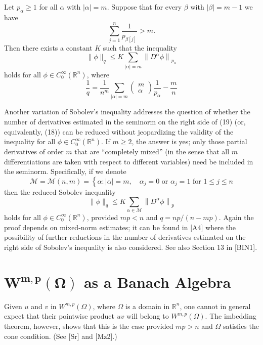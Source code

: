 \begin{theorem}
  Let $p_\alpha \geq 1$ for all $\alpha$ with $|\alpha|=m$. Suppose that for every $\beta$ with $|\beta|=m-1$ we have
  \[
  \sum_{j=1}^n \frac{1}{p_{\beta[j]}}>m .
  \]
  Then there exists a constant $K$ such that the inequality
  \[
  \|\phi\|_q \leq K \sum_{|\alpha|=m}\left\|D^\alpha \phi\right\|_{p_\alpha}
  \]
  holds for all $\phi \in C_0^{\infty}\left(\mathbb{R}^n\right)$, where
  \[
  \frac{1}{q}=\frac{1}{n^m} \sum_{|\alpha|=m}\left(\begin{array}{c}
  m \\
  \alpha
  \end{array}\right) \frac{1}{p_\alpha}-\frac{m}{n}
  \]
\end{theorem}


\begin{para}
  Another variation of Sobolev's inequality addresses the question of whether the number of derivatives estimated in the seminorm on the right side of (19) (or, equivalently, (18)) can be reduced without jeopardizing the validity of the inequality for all $\phi \in C_0^{\infty}\left(\mathbb{R}^n\right)$. If $m \geq 2$, the answer is yes; only those partial derivatives of order $m$ that are ``completely mixed'' (in the sense that all $m$ differentiations are taken with respect to different variables) need be included in the seminorm. Specifically, if we denote
  \[
  \mathcal{M}=\mathcal{M}(n, m)=\left\{\alpha:|\alpha|=m, \quad \alpha_j=0 \text { or } \alpha_j=1 \text { for } 1 \leq j \leq n\right.
  \]
  then the reduced Sobolev inequality
  \[
  \|\phi\|_q \leq K \sum_{\alpha \in \mathcal{M}}\left\|D^\alpha \phi\right\|_p
  \]
  holds for all $\phi \in C_0^{\infty}\left(\mathbb{R}^n\right)$, provided $m p<n$ and $q=n p /(n-m p)$. Again the proof depends on mixed-norm estimates; it can be found in [A4] where the possibility of further reductions in the number of derivatives estimated on the right side of Sobolev's inequality is also considered. See also Section 13 in [BIN1].
\end{para}


\section[$W^{m,p}(\Omega)$ as a Banach Algebra]%
  {$\bm{W^{m,p}(\Omega)}$ as a Banach Algebra}


\begin{para}
  Given $u$ and $v$ in $W^{m,p}(\Omega)$, where $\Omega$ is a domain in $\mathbb{R}^n$, one cannot in general expect that their pointwise product $u v$ will belong to $W^{m,p}(\Omega)$. The imbedding theorem, however, shows that this is the case provided $m p>n$ and $\Omega$ satisfies the cone condition. (See [Sr] and [Mz2].)
\end{para}


